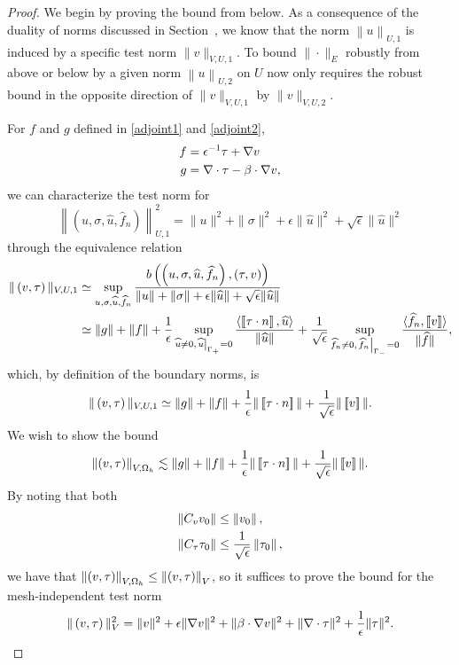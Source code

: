 \begin{proof}
We begin by proving the bound from below. As a consequence of the duality of norms discussed in Section~, we know that the norm $\left\| u \right\|_{U,1}$ is induced by a specific test norm $\| v  \|_{V,U,1}$.  To bound $\|\cdot\|_E$ robustly from above or below by a given norm $\left\| u \right\|_{U,2}$ on $U$ now only requires the robust bound in the opposite direction of $\| v \|_{V,U,1}$ by $\|v\|_{V,U,2}$. 

For $f$ and $g$ defined in \eqref{adjoint1} and \eqref{adjoint2},
\begin{align*}
f &= \epsilon^{-1}\tau + \grad v  \\
g &=\div \tau - \beta\cdot \grad v,
\end{align*} 
we can characterize the test norm for 
\[
\left\|\left(u,\sigma,\widehat{u},\widehat{f}_n\right)\right\|_{U,1}^2 = \|u\|^2 + \|\sigma\|^2 + \epsilon\|\widehat{u}\|^2+ \sqrt{\epsilon}\|\widehat{u}\|^2
\]
through the equivalence relation
\begin{align*}
\|\left(v,\tau\right)\|_{V,U,1} &\simeq \sup_{u,\sigma,\widehat{u},\widehat{f}_n}\frac{b\left(\left(u,\sigma,\widehat{u},\widehat{f}_n\right),\left(\tau,v\right)\right)}{\|u\| + \|\sigma\| + \epsilon\|\widehat{u}\|+ \sqrt{\epsilon}\|\widehat{u}\|}\\
& \simeq \|g\| + \|f\| + \frac{1}{\epsilon}\sup_{\widehat{u}\neq 0, \left.\widehat{u}\right|_{\Gamma_+} = 0} \frac{\langle \jump{\tau\cdot n}, \widehat{u}\rangle}{\|\widehat{u}\|} + \frac{1}{\sqrt{\epsilon}}\sup_{\widehat{f}_n\neq 0, \left.\widehat{f}_n\right|_{\Gamma_-}=0}\frac{\langle \widehat{f}_n, \jump{v}\rangle}{\|\widehat{f}\|},
\end{align*}
which, by definition of the boundary norms, is 
\[
\|\left(v,\tau\right)\|_{V,U,1} \simeq \|g\| + \|f\| + \frac{1}{\epsilon}\|\jump{\tau\cdot n}\| + \frac{1}{\sqrt{\epsilon}}\|\jump{v}\|.
\]
We wish to show the bound
\[
\nor{\left(v,\tau\right)}_{V,\Oh} \lesssim \|g\| + \|f\| + \frac{1}{\epsilon}\|\jump{\tau\cdot n}\| + \frac{1}{\sqrt{\epsilon}}\|\jump{v}\|.
\]
By noting that both 
\begin{align*}
\nor{C_vv_0} &\leq \nor{v_0},\\
\nor{C_\tau\tau_0} &\leq \frac{1}{\sqrt{\epsilon}}\nor{\tau_0},
\end{align*}
we have that $\nor{\left(v,\tau\right)}_{V,\Oh} \leq \nor{\left(v,\tau\right)}_{V}$, so it suffices to prove the bound for the mesh-independent test norm 
\[
\|\left(v,\tau\right)\|_{V}^2 = \|v\|^2 + \epsilon \|\grad v\|^2 + \|\beta \cdot \grad v\|^2 + \| \div \tau\|^2 + \frac{1}{\epsilon}\|\tau\|^2.
\]


\end{proof}
